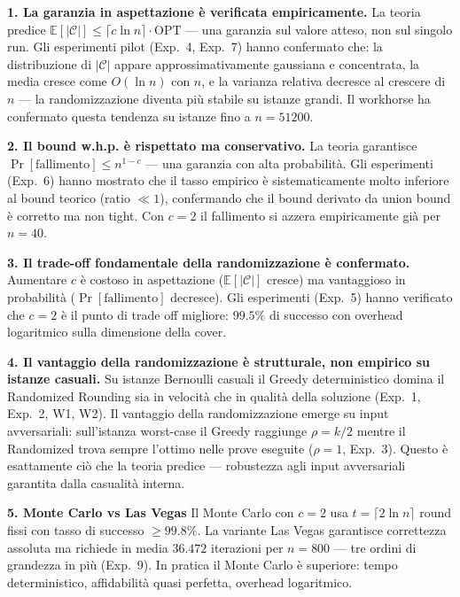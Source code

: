 \documentclass[12pt, a4paper]{article}
\begin{document}
\textbf{1. La garanzia in aspettazione \`e verificata empiricamente.}
La teoria predice $\mathbb{E}[|\mathcal{C}|] \leq \lceil c \ln n \rceil 
\cdot \mathrm{OPT}$ — una garanzia sul valore atteso, non sul singolo run.
Gli esperimenti pilot (Exp.~4, Exp.~7) hanno confermato che:
la distribuzione di $|\mathcal{C}|$ appare approssimativamente gaussiana e concentrata,
la media cresce come $O(\ln n)$ con $n$,
e la varianza relativa decresce al crescere di $n$ — 
la randomizzazione diventa pi\`u stabile su istanze grandi.
Il workhorse ha confermato questa tendenza su istanze fino a $n=51200$.

\textbf{2. Il bound w.h.p. \`e rispettato ma conservativo.}
La teoria garantisce $\Pr[\text{fallimento}] \leq n^{1-c}$ — 
una garanzia con alta probabilit\`a. Gli esperimenti (Exp.~6) 
hanno mostrato che il tasso empirico \`e sistematicamente molto 
inferiore al bound teorico (ratio $\ll 1$), confermando che 
il bound derivato da union bound \`e corretto ma non tight. 
Con $c=2$ il fallimento si azzera empiricamente gi\`a per $n=40$.

\textbf{3. Il trade-off fondamentale della randomizzazione \`e confermato.}
Aumentare $c$ \`e costoso in aspettazione 
($\mathbb{E}[|\mathcal{C}|]$ cresce) ma vantaggioso in probabilit\`a 
($\Pr[\text{fallimento}]$ decresce). 
Gli esperimenti (Exp.~5) hanno verificato che $c=2$ \`e il punto 
di trade off migliore: $99.5\%$ di successo con overhead 
logaritmico sulla dimensione della cover.

\textbf{4. Il vantaggio della randomizzazione \`e strutturale, 
non empirico su istanze casuali.}
Su istanze Bernoulli casuali il Greedy deterministico domina 
il Randomized Rounding sia in velocit\`a che in qualit\`a 
della soluzione (Exp.~1, Exp.~2, W1, W2). 
Il vantaggio della randomizzazione emerge su input avversariali: 
sull'istanza worst-case il Greedy raggiunge $\rho = k/2$ mentre 
il Randomized trova sempre l'ottimo nelle prove eseguite ($\rho=1$, Exp.~3). 
Questo \`e esattamente ci\`o che la teoria predice — robustezza 
agli input avversariali garantita dalla casualit\`a interna.

\textbf{5. Monte Carlo vs Las Vegas}
Il Monte Carlo con $c=2$ usa $t = \lceil 2 \ln n \rceil$ round fissi 
con tasso di successo $\geq 99.8\%$. La variante Las Vegas garantisce 
correttezza assoluta ma richiede in media $36.472$ iterazioni 
per $n=800$ — tre ordini di grandezza in pi\`u (Exp.~9). 
In pratica il Monte Carlo \`e superiore: tempo deterministico, 
affidabilit\`a quasi perfetta, overhead logaritmico.
\end{document}
